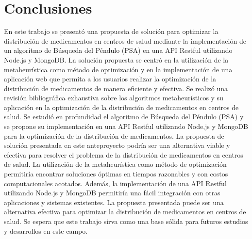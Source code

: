 \documentclass[conference]{IEEEtran}
\begin{document}
\section{Conclusiones}
\label{sec:Conclusiones}
En este trabajo se presentó una propuesta de solución para optimizar la
distribución de medicamentos en centros de salud mediante la implementación de
un algoritmo de Búsqueda del Péndulo (PSA) en una API Restful utilizando
Node.js y MongoDB. La solución propuesta se centró en la utilización de la
metaheurística como método de optimización y en la implementación de una
aplicación web que permita a los usuarios realizar la optimización de la
distribución de medicamentos de manera eficiente y efectiva.
Se realizó una revisión bibliográfica exhaustiva sobre los algoritmos
metaheurísticos y su aplicación en la optimización de la distribución de
medicamentos en centros de salud. Se estudió en profundidad el algoritmo de
Búsqueda del Péndulo (PSA) y se propone su implementación en una API Restful
utilizando Node.js y MongoDB para la optimización de la distribución de
medicamentos.
La propuesta de solución presentada en este anteproyecto podría ser una
alternativa viable y efectiva para resolver el problema de la distribución de
medicamentos en centros de salud. La utilización de la metaheurística como
método de optimización permitiría encontrar soluciones óptimas en tiempos
razonables y con costos computacionales acotados. Además, la implementación de
una API Restful utilizando Node.js y MongoDB permitiría una fácil integración
con otras aplicaciones y sistemas existentes.
La propuesta presentada puede ser una alternativa efectiva para optimizar la
distribución de medicamentos en centros de salud. Se espera que este trabajo
sirva como una base sólida para futuros estudios y desarrollos en este campo.



\end{document}
